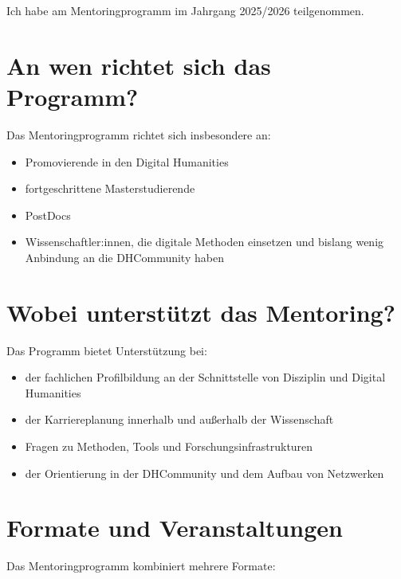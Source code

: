 \documentclass[letterpaper,10pt,english]{jupyterBook}
\begin{document}
\sphinxAtStartPar
Ich habe am Mentoringprogramm im Jahrgang 2025/2026 teilgenommen.


\section{An wen richtet sich das Programm?}
\label{\detokenize{mentoring/programm:an-wen-richtet-sich-das-programm}}
\sphinxAtStartPar
Das Mentoringprogramm richtet sich insbesondere an:
\begin{itemize}
\item {} 
\sphinxAtStartPar
Promovierende in den Digital Humanities

\item {} 
\sphinxAtStartPar
fortgeschrittene Masterstudierende

\item {} 
\sphinxAtStartPar
PostDocs

\item {} 
\sphinxAtStartPar
Wissenschaftler:innen, die digitale Methoden einsetzen und bislang wenig Anbindung an die DH\sphinxhyphen{}Community haben

\end{itemize}


\section{Wobei unterstützt das Mentoring?}
\label{\detokenize{mentoring/programm:wobei-unterstutzt-das-mentoring}}
\sphinxAtStartPar
Das Programm bietet Unterstützung bei:
\begin{itemize}
\item {} 
\sphinxAtStartPar
der fachlichen Profilbildung an der Schnittstelle von Disziplin und Digital Humanities

\item {} 
\sphinxAtStartPar
der Karriereplanung innerhalb und außerhalb der Wissenschaft

\item {} 
\sphinxAtStartPar
Fragen zu Methoden, Tools und Forschungsinfrastrukturen

\item {} 
\sphinxAtStartPar
der Orientierung in der DH\sphinxhyphen{}Community und dem Aufbau von Netzwerken

\end{itemize}


\section{Formate und Veranstaltungen}
\label{\detokenize{mentoring/programm:formate-und-veranstaltungen}}
\sphinxAtStartPar
Das Mentoringprogramm kombiniert mehrere Formate:
\end{document}
